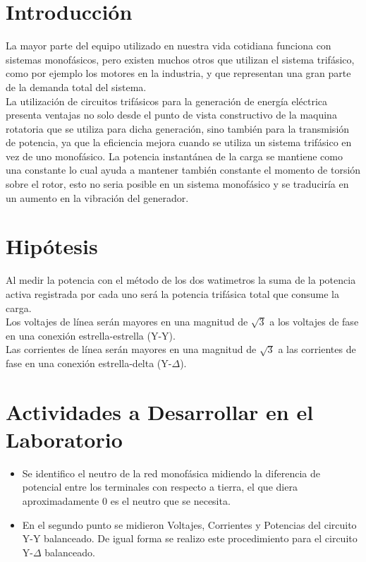 \documentclass[twocolumn]{IEEEtran}
\begin{document}
\section{Introducción}
\noindent
La mayor parte del equipo utilizado en nuestra vida cotidiana funciona con sistemas monofásicos, pero existen muchos otros que utilizan el sistema trifásico, como por ejemplo los motores en la industria, y que representan una gran parte de la demanda total del sistema.\\
La utilización de circuitos trifásicos para la generación de energía eléctrica presenta  ventajas no solo desde el punto de vista constructivo de la maquina rotatoria que se utiliza para dicha generación, sino también para la transmisión de potencia, ya que la eficiencia mejora cuando se utiliza un sistema trifásico en vez de uno monofásico. La potencia instantánea de la carga se mantiene como una constante lo cual ayuda a mantener también constante el momento de torsión sobre el rotor, esto no seria posible en un sistema monofásico y se traduciría en un aumento en la vibración del generador.

\section{Hipótesis}
\noindent
Al medir la potencia con el método de los dos watimetros la suma de la potencia activa registrada por cada uno será la potencia trifásica total que consume la carga.\\
Los voltajes de línea serán mayores en una magnitud de $\sqrt{3}$ a los voltajes de fase en una conexión estrella-estrella (Y-Y).\\
Las corrientes de línea serán mayores en una magnitud de $\sqrt{3}$ a las corrientes de fase en una conexión estrella-delta (Y-$\Delta$).

\section{Actividades a Desarrollar en el Laboratorio}
\noindent
\begin{itemize}
 \item Se identifico el neutro de la red monofásica midiendo la diferencia de potencial entre los terminales con respecto a tierra, el que diera aproximadamente $0$ es el neutro que se necesita.
 \item En el segundo punto se midieron Voltajes, Corrientes y Potencias del circuito Y-Y balanceado. De igual forma se realizo este procedimiento para el circuito Y-$\Delta$ balanceado.
\end{itemize}
\end{document}
